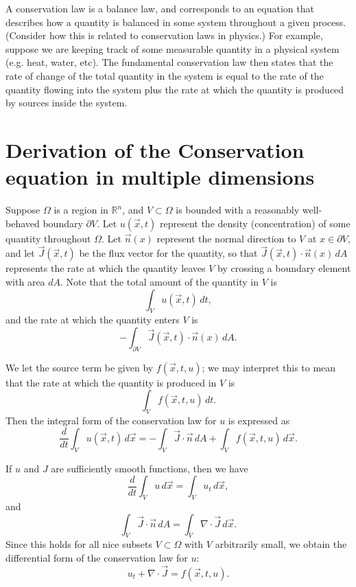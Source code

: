 \label{lab:finitedifference1}

A conservation law is a balance law, and corresponds to an equation that describes how a quantity is balanced in some system throughout a given process.
(Consider how this is related to conservation laws in physics.)
For example, suppose we are keeping track of some measurable quantity in a physical system (e.g. heat, water, etc).
The fundamental conservation law then states that the rate of change of the total quantity in the system is equal to the rate of the quantity flowing into the system plus the rate at which the quantity is produced by sources inside the system.

\section*{Derivation of the Conservation equation in multiple dimensions}
Suppose $\Omega$ is a region in $\mathbb{R}^n$, and $V \subset \Omega$ is bounded with a reasonably well-behaved boundary $\partial V$.
Let $u(\vec{x},t)$ represent the density (concentration) of some quantity throughout $\Omega$.
Let $\vec{n}(x)$ represent the normal direction to $V$ at $x \in \partial V$, and let $\vec{J}(\vec{x},t)$ be the flux vector for the quantity, so that $\vec{J}(\vec{x},t) \cdot \vec{n}(x) \, dA$ represents the rate at which the quantity leaves $V$ by crossing a boundary element with area $dA$.
Note that the total amount of the quantity in $V$ is
\[ \int_V u(\vec{x},t)\, dt,\]
and the rate at which the quantity enters $V$ is
\[-\int_{\partial V} \vec{J}(\vec{x},t) \cdot \vec{n}(x) \, dA.\]

We let the source term be given by $f(\vec{x},t,u)$; we may interpret this to mean that the rate at which the quantity is produced in $V$ is 
\[\int_V f(\vec{x},t,u)\, dt.\]
Then the integral form of the conservation law for $u$ is expressed as 
\[\frac{d}{dt} \int_V u(\vec{x},t) \, d\vec{x} = -\int_V \vec{J}\cdot \vec{n}\, dA + \int_V f(\vec{x},t,u)\, d\vec{x}.\]

If $u$ and $J$ are sufficiently smooth functions, then we have 
\[ \frac{d}{dt} \int_V u\, d\vec{x} = \int_V u_t \, d\vec{x},\]
and 
\[ \int_V \vec{J}\cdot \vec{n}\, dA = \int_V \nabla \cdot \vec{J}\, d\vec{x} .\]
Since this holds for all nice subsets $V \subset \Omega$ with $V$ arbitrarily small, we obtain the differential form of the conservation law for $u$: 
\[ u_t + \nabla \cdot \vec{J} = f(\vec{x},t,u) .\]

